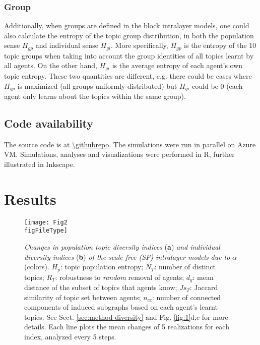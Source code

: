 \documentclass{svproc}
\def\figFileType{.eps}
\begin{document}
\vspace{-1em}
\subsubsection*{Group}

Additionally, when groups are defined in the block intralayer models, one could also calculate the entropy of the topic group distribution, in both the population sense $H_{gp}$ and individual sense $H_{gi}$.
More specifically, $H_{gp}$ is the entropy of the 10 topic groups when taking into account the group identities of all topics learnt by all agents.
On the other hand, $H_{gi}$ is the average entropy of each agent's own topic entropy.
These two quantities are different, e.g. there could be cases where $H_{gp}$ is maximized (all groups uniformly distributed) but $H_{gi}$ could be 0 (each agent only learns about the topics within the same group).

\subsection{Code availability}

The source code is at \url{\githubrepo}.
The simulations were run in parallel on Azure VM. Simulations, analyses and visualizations were performed in R, further illustrated in Inkscape.

\section{Results}

\begin{figure}[!ht]
    \centering
    \texttt{[image: Fig2\\figFileType]}
    \caption{
    \textit{Changes in population topic diversity indices} (\textbf{a}) \textit{and individual diversity indices} (\textbf{b}) \textit{of the scale-free (SF) intralayer models} \textit{due to} $\alpha$ (colors).
    $H_p$: topic population entropy;
    $N_T$: number of distinct topics;
    $R_T$: robustness to \textit{random} removal of agents;
    $d_g$: mean distance of the subset of topics that agents know;
    $Js_T$: Jaccard similarity of topic set between agents;
    $n_{cc}$: number of connected components of induced subgraphs based on each agent's learnt topics.
    See Sect. \ref{sec:method-diversity} and Fig. \ref{fig:1}d,e for more details.
    Each line plots the mean changes of 5 realizations for each index, analyzed every 5 steps.
    }
    \label{fig:2}
\end{figure}
\end{document}

